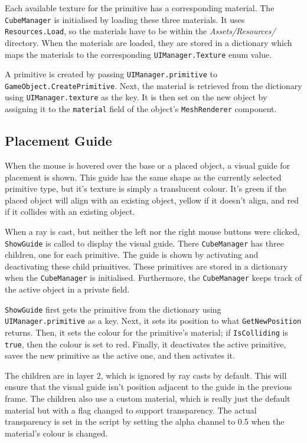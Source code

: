 \documentclass[a4paper, 12pt]{scrartcl}
\begin{document}
Each available texture for the primitive has a corresponding material. The \texttt{CubeManager} is initialised by loading these three materials. It uses \texttt{Resources.Load}, so the materials have to be within the \textit{Assets/Resources/} directory. When the materials are loaded, they are stored in a dictionary which maps the materials to the corresponding \texttt{UIManager.Texture} enum value.

A primitive is created by passing \texttt{UIManager.primitive} to \texttt{GameObject.CreatePrimitive}. Next, the material is retrieved from the dictionary using \texttt{UIManager.texture} as the key. It is then set on the new object by assigning it to the \texttt{material} field of the object's \texttt{MeshRenderer} component.

\subsection{Placement Guide}
When the mouse is hovered over the base or a placed object, a visual guide for placement is shown. This guide has the same shape as the currently selected primitive type, but it's texture is simply a translucent colour. It's green if the placed object will align with an existing object, yellow if it doesn't align, and red if it collides with an existing object.

When a ray is cast, but neither the left nor the right mouse buttons were clicked, \texttt{ShowGuide} is called to display the visual guide. There \texttt{CubeManager} has three children, one for each primitive. The guide is shown by activating and deactivating these child primitives. These primitives are stored in a dictionary when the \texttt{CubeManager} is initialised. Furthermore, the \texttt{CubeManager} keeps track of the active object in a private field.

\texttt{ShowGuide} first gets the primitive from the dictionary using \texttt{UIManager.primitive} as a key. Next, it sets its position to what \texttt{GetNewPosition} returns. Then, it sets the colour for the primitive's material; if \texttt{IsColliding} is \texttt{true}, then the colour is set to red. Finally, it deactivates the active primitive, saves the new primitive as the active one, and then activates it.

The children are in layer 2, which is ignored by ray casts by default. This will ensure that the visual guide isn't position adjacent to the guide in the previous frame. The children also use a custom material, which is really just the default material but with a flag changed to support transparency. The actual transparency is set in the script by setting the alpha channel to 0.5 when the material's colour is changed.
\end{document}
